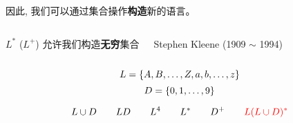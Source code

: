\begin{frame}{}
  \begin{center}

    \vspace{0.80cm}
    因此, 我们可以通过集合操作{\bf 构造}新的语言。
  \end{center}
\end{frame}

\begin{frame}{}
  \begin{columns}

      \begin{center}
        $L^{\ast}$ ($L^{+}$) 允许我们构造{\bf 无穷}集合
      \end{center}
      \begin{center}
        Stephen Kleene (1909 $\sim$ 1994)
      \end{center}
  \end{columns}
\end{frame}

\begin{frame}{}
  \[
    L = \{A, B, \dots, Z, a, b, \dots, z\}
  \]
  \[
    D = \{0, 1, \dots, 9\}
  \]

  \pause
  \[
    L \cup D \qquad LD \qquad L^4 \qquad L^{\ast} \qquad D^{+}
    \qquad \textcolor{red}{L(L \cup D)^{\ast}}
  \]
\end{frame}
